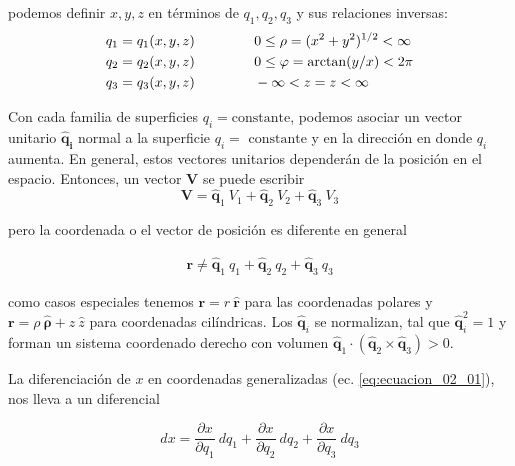 podemos definir $x,y,z$ en términos de $q_{1}, q_{2}, q_{3}$ y sus relaciones inversas:
\begin{eqnarray}
\begin{aligned}
q_{1} = q_{1}(x,y,z) & \hspace{1.5cm} 0 \leq \rho = (x^{2} + y^{2})^{1/2} < \infty \\
q_{2} = q_{2}(x,y,z) & \hspace{1.5cm} 0 \leq \varphi = \arctan(y/x) < 2 \pi \\
q_{3} = q_{3}(x,y,z) & \hspace{1.5cm} - \infty < z = z < \infty
\end{aligned}
\label{eq:ecuacion_02_02}
\end{eqnarray}

Con cada familia de superficies $q_{i} = \mbox {constante}$, podemos asociar un vector unitario $\mathbf{\widehat{q}_{i}}$ normal a la superficie $q_{i} = \mbox{ constante}$ y en la dirección en donde $q_{i}$ aumenta. En general, estos vectores unitarios dependerán de la posición en el espacio. Entonces,  un vector $\mathbf{V}$ se puede escribir
\begin{equation}
\mathbf{V} = \mathbf{\widehat{q}}_{1} \: V_{1} +\mathbf{\widehat{q}}_{2} \: V_{2} + \mathbf{\widehat{q}}_{3} \: V_{3}
\label{eq:ecuacion_02_03}
\end{equation}

pero la coordenada o el vector de posición es diferente en general

\begin{align*} \mathbf{r} \neq \mathbf{\widehat{q}}_{1} \: q_{1} + \mathbf{\widehat{q}}_{2} \: q_{2} + \mathbf{\widehat{q}}_{3} \: q_{3}
\end{align*}

como casos especiales tenemos $\mathbf{r} = r \: \mathbf{\widehat{r}}$ para las coordenadas polares y $\mathbf{r} = \rho \: \mathbf{\widehat{\rho}} + z \: \widehat{z}$ para coordenadas cilíndricas. Los $\mathbf{\widehat{q}}_{i}$ se normalizan, tal que $\mathbf{\widehat{q}}_{i}^{2} = 1$ y forman un sistema coordenado derecho con volumen $\mathbf{\widehat{q}}_{1} \cdot (\mathbf{\widehat{q}}_{2} \times \mathbf{\widehat{q}}_{3} ) > 0$.


La diferenciación de $x$ en coordenadas generalizadas (ec. \ref{eq:ecuacion_02_01}), nos lleva a un diferencial

\begin{equation}
dx  = \dfrac{\partial x}{\partial q_{1}} \: d q_{1} + \dfrac{\partial x}{\partial q_{2}} \: d q_{2} + \dfrac{\partial x}{\partial q_{3}} \: d q_{3}
\label{eq:ecuacion_02_04}
\end{equation}

